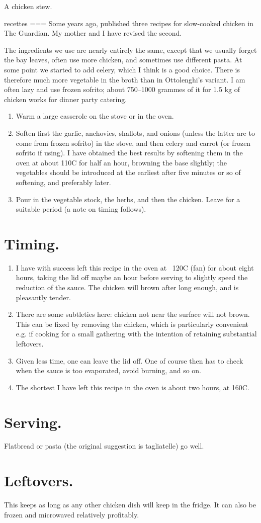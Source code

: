 A chicken stew.

recettes
===
Some years ago, \textcite{ottolenghi2017} published three recipes for slow-cooked chicken in The Guardian. My mother and I have revised the second.

The ingredients we use are nearly entirely the same, except that we usually forget the bay leaves, often use more chicken, and sometimes use different pasta. At some point we started to add celery, which I think is a good choice. There is therefore much more vegetable in the broth than in Ottolenghi’s variant. I am often lazy and use frozen sofrito; about 750–1000 grammes of it for 1.5 kg of chicken works for dinner party catering.
\begin{enumerate}
\item    Warm a large casserole on the stove or in the oven.
\item    Soften first the garlic, anchovies, shallots, and onions (unless the latter are to come from frozen sofrito) in the stove, and then celery and carrot (or frozen sofrito if using). I have obtained the best results by softening them in the oven at about 110C for half an hour, browning the base slightly; the vegetables should be introduced at the earliest after five minutes or so of softening, and preferably later.
\item    Pour in the vegetable stock, the herbs, and then the chicken. Leave for a suitable period (a note on timing follows).
\end{enumerate}

\section*{Timing.}
\begin{enumerate}
    \item I have with success left this recipe in the oven at ~120C (fan) for about eight hours, taking the lid off maybe an hour before serving to slightly speed the reduction of the sauce. The chicken will brown after long enough, and is pleasantly tender.
    \item There are some subtleties here: chicken not near the surface will not brown. This can be fixed by removing the chicken, which is particularly convenient e.g. if cooking for a small gathering with the intention of retaining substantial leftovers.
    \item Given less time, one can leave the lid off. One of course then has to check when the sauce is too evaporated, avoid burning, and so on.
    \item The shortest I have left this recipe in the oven is about two hours, at 160C.
\end{enumerate}

\section*{Serving.}
Flatbread or pasta (the original suggestion is tagliatelle) go well.

\section*{Leftovers.}
This keeps as long as any other chicken dish will keep in the fridge. It can also be frozen and microwaved relatively profitably.